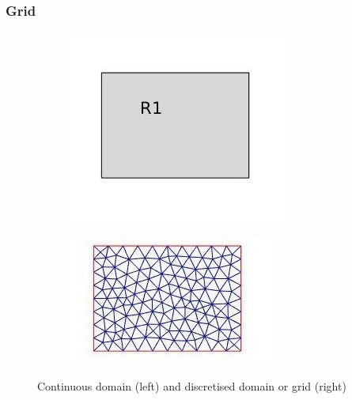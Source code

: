 \documentclass{beamer}
\begin{document}
\begin{frame}
\frametitle{Grid}
\begin{figure}
\begin{subfigure}{0.45\textwidth}
\centering
  \includegraphics[width=\linewidth]{domain.jpg}
  \label{fig:Domain}
\end{subfigure}
\begin{subfigure}{0.45\textwidth}	
\centering
  \includegraphics[width=\linewidth]{grid.jpg}
  \label{fig:Mesh}
\end{subfigure}
\caption{Continuous domain (left) and discretised domain or grid (right)}
\label{fig:continuous_grid_figure}
\end{figure}

\end{frame}
\end{document}
